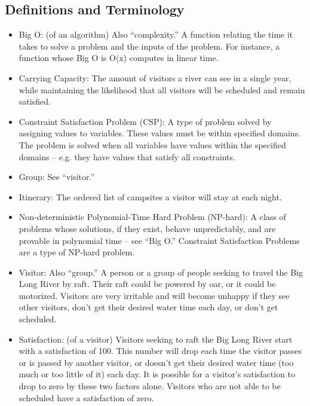 \documentclass[11pt]{article} %
\begin{document}
\subsection{Definitions and Terminology}
\label{sec:defs}
\begin{itemize}
\item Big O: (of an algorithm) Also ``complexity.'' A function relating the
time it takes to solve a problem and the inputs of the problem. For instance,
a function whose Big O is O(x) computes in linear time.

\item Carrying Capacity: The amount of visitors a river can see in a single
year, while maintaining the likelihood that all visitors will be scheduled and
remain satisfied.

\item Constraint Satisfaction Problem (CSP): A type of problem solved by
assigning values to variables. These values must be within specified domains.
The problem is solved when all variables have values within the specified
domains -- e.g. they have values that satisfy all constraints.

\item Group: See ``visitor.''

\item Itinerary: The ordered list of campsites a visitor will stay at each
night.

\item Non-deterministic Polynomial-Time Hard Problem (NP-hard): A class of
problems whose solutions, if they exist, behave unpredictably, and are
provable in polynomial time -- see ``Big O.'' Constraint Satisfaction Problems
are a type of NP-hard problem.

\item Visitor: Also ``group.'' A person or a group of people
seeking to travel the Big Long River by raft. Their raft could be powered
by oar, or it could be motorized. Visitors are very irritable and will
become unhappy if they see other visitors, don't get their desired water
time each day, or don't get scheduled.

\item Satisfaction: (of a visitor) Visitors seeking to raft the Big Long River
start with a satisfaction of 100. This number will drop each time the visitor
passes or is passed by another visitor, or doesn't get their desired water time 
(too much or too little of it) each day. It is possible for a visitor's 
satisfaction to drop to zero by these two factors alone. Visitors who are not 
able to be scheduled have a satisfaction of zero.


\end{itemize}
\end{document}
